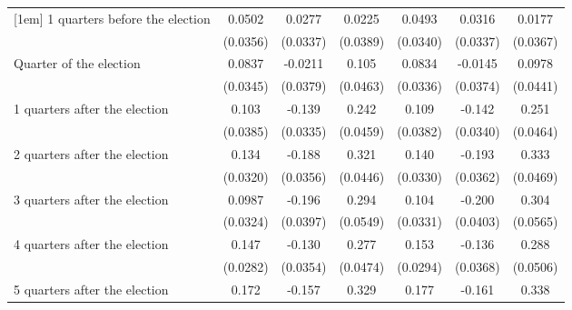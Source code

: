 \begin{table}[!ht]
\begin{tabular}{l*{6}{c}}
[1em]
 1 quarters before the election&      0.0502         &      0.0277         &      0.0225         &      0.0493         &      0.0316         &      0.0177         \\
                    &    (0.0356)         &    (0.0337)         &    (0.0389)         &    (0.0340)         &    (0.0337)         &    (0.0367)         \\
[1em]
Quarter of the election&      0.0837\sym{*}  &     -0.0211         &       0.105\sym{*}  &      0.0834\sym{*}  &     -0.0145         &      0.0978\sym{*}  \\
                    &    (0.0345)         &    (0.0379)         &    (0.0463)         &    (0.0336)         &    (0.0374)         &    (0.0441)         \\
[1em]
 1 quarters after the election&       0.103\sym{**} &      -0.139\sym{***}&       0.242\sym{***}&       0.109\sym{**} &      -0.142\sym{***}&       0.251\sym{***}\\
                    &    (0.0385)         &    (0.0335)         &    (0.0459)         &    (0.0382)         &    (0.0340)         &    (0.0464)         \\
[1em]
 2 quarters after the election&       0.134\sym{***}&      -0.188\sym{***}&       0.321\sym{***}&       0.140\sym{***}&      -0.193\sym{***}&       0.333\sym{***}\\
                    &    (0.0320)         &    (0.0356)         &    (0.0446)         &    (0.0330)         &    (0.0362)         &    (0.0469)         \\
[1em]
 3 quarters after the election&      0.0987\sym{**} &      -0.196\sym{***}&       0.294\sym{***}&       0.104\sym{**} &      -0.200\sym{***}&       0.304\sym{***}\\
                    &    (0.0324)         &    (0.0397)         &    (0.0549)         &    (0.0331)         &    (0.0403)         &    (0.0565)         \\
[1em]
 4 quarters after the election&       0.147\sym{***}&      -0.130\sym{***}&       0.277\sym{***}&       0.153\sym{***}&      -0.136\sym{***}&       0.288\sym{***}\\
                    &    (0.0282)         &    (0.0354)         &    (0.0474)         &    (0.0294)         &    (0.0368)         &    (0.0506)         \\
[1em]
 5 quarters after the election&       0.172\sym{***}&      -0.157\sym{***}&       0.329\sym{***}&       0.177\sym{***}&      -0.161\sym{***}&       0.338\sym{***}\\

\end{tabular}
\end{table}

